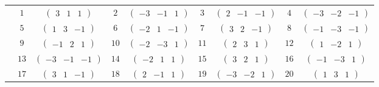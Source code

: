 \documentclass[fleqn,10pt,landscape]{article}
\begin{document}
\begin{itemize}
{\begin{center}
\begin{longtable}{ccccccccc}
 & $ 1 $ & $ \begin{pmatrix} 3 & 1 & 1 \end{pmatrix} $ & $ 2 $ & $ \begin{pmatrix} -3 & -1 & 1 \end{pmatrix} $ & $ 3 $ & $ \begin{pmatrix} 2 & -1 & -1 \end{pmatrix} $ & $ 4 $ & $ \begin{pmatrix} -3 & -2 & -1 \end{pmatrix} $ \\
& $ 5 $ & $ \begin{pmatrix} 1 & 3 & -1 \end{pmatrix} $ & $ 6 $ & $ \begin{pmatrix} -2 & 1 & -1 \end{pmatrix} $ & $ 7 $ & $ \begin{pmatrix} 3 & 2 & -1 \end{pmatrix} $ & $ 8 $ & $ \begin{pmatrix} -1 & -3 & -1 \end{pmatrix} $ \\
& $ 9 $ & $ \begin{pmatrix} -1 & 2 & 1 \end{pmatrix} $ & $ 10 $ & $ \begin{pmatrix} -2 & -3 & 1 \end{pmatrix} $ & $ 11 $ & $ \begin{pmatrix} 2 & 3 & 1 \end{pmatrix} $ & $ 12 $ & $ \begin{pmatrix} 1 & -2 & 1 \end{pmatrix} $ \\
& $ 13 $ & $ \begin{pmatrix} -3 & -1 & -1 \end{pmatrix} $ & $ 14 $ & $ \begin{pmatrix} -2 & 1 & 1 \end{pmatrix} $ & $ 15 $ & $ \begin{pmatrix} 3 & 2 & 1 \end{pmatrix} $ & $ 16 $ & $ \begin{pmatrix} -1 & -3 & 1 \end{pmatrix} $ \\
& $ 17 $ & $ \begin{pmatrix} 3 & 1 & -1 \end{pmatrix} $ & $ 18 $ & $ \begin{pmatrix} 2 & -1 & 1 \end{pmatrix} $ & $ 19 $ & $ \begin{pmatrix} -3 & -2 & 1 \end{pmatrix} $ & $ 20 $ & $ \begin{pmatrix} 1 & 3 & 1 \end{pmatrix} $ \\

\end{longtable}
\end{center}}
\end{itemize}
\end{document}
